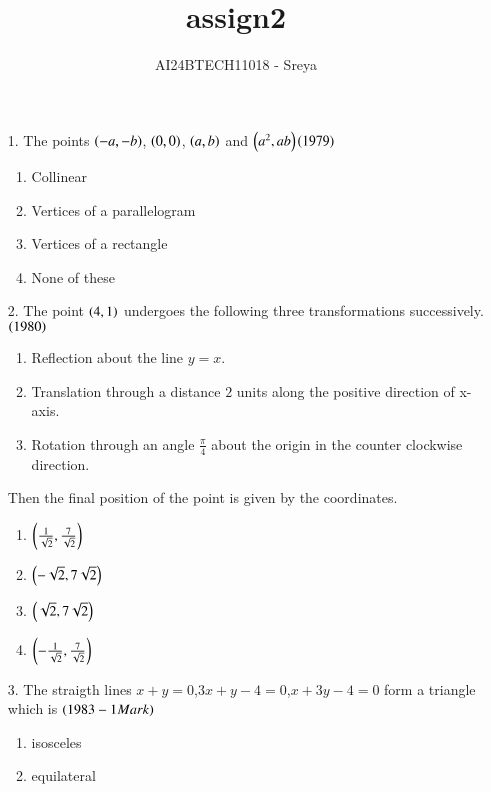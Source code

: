 \documentclass[journal,12pt,onecolumn]{IEEEtran}
\theoremstyle{remark}
\begin{document}

\vspace{3cm}

\title{assign2}
\author{AI24BTECH11018 - Sreya}
\maketitle
\bigskip
    

\newcommand{\ratio}[2]{\ensuremath{#1 : #2}}
\renewcommand{\thefigure}{\theenumi}
\renewcommand{\thetable}{\theenumi}
\begin{enumerate}
\item[1.] The points $\left(-a,-b\right)$, $\left(0,0\right)$, $\left(a,b\right)$ and $\left(a^2,ab\right)$\hfill{$\left(1979\right)$}
\begin{enumerate}
      \item Collinear
    \item  Vertices of a parallelogram
    \item Vertices of a rectangle
    \item None of these
\end{enumerate}
\item[2.]  The point $\left(4,1\right)$ undergoes the following three transformations successively.
\hfill{$\left(1980\right)$}
\begin{enumerate}
    \item Reflection about the line $y=x$.
    \item Translation through a distance $2$ units along the positive direction of x-axis.
    \item Rotation through an angle $\frac{\pi}{4}$ about the origin in the counter clockwise direction.
\end{enumerate}
Then the final position of the point is given by the coordinates.
\begin{enumerate} 
    \item $\left(\frac{1}{\sqrt{2}},\frac{7}{\sqrt{2}}\right)$
    \item $\left(-\sqrt{2},7\sqrt{2}\right)$
    \item $\left(\sqrt{2},7\sqrt{2}\right)$
    \item $\left(-\frac{1}{\sqrt{2}},\frac{7}{\sqrt{2}}\right)$
\end{enumerate}
\item[3.] The straigth lines $x+y=0$,$3x+y-4=0$,$x+3y-4=0$ form a triangle which is \hfill{$\left(1983-1 Mark\right)$}
\begin{enumerate}   
     \item isosceles
     \item equilateral

\end{enumerate}
\end{enumerate}
\end{document}
